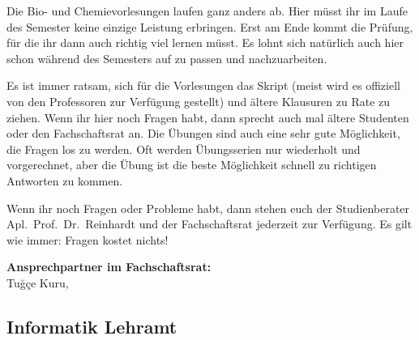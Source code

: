 Die Bio- und Chemievorlesungen laufen ganz anders ab.
Hier müsst ihr im Laufe des Semester keine einzige Leistung erbringen.
Erst am Ende kommt die Prüfung, für die ihr dann auch richtig viel lernen müsst.
Es lohnt sich natürlich auch hier schon während des Semesters auf zu passen und nachzuarbeiten.

Es ist immer ratsam, sich für die Vorlesungen das Skript (meist wird es offiziell von den Professoren zur Verfügung gestellt) und ältere Klausuren zu Rate zu ziehen.
Wenn ihr hier noch Fragen habt, dann sprecht auch mal ältere Studenten oder den Fachschaftsrat an.
Die Übungen sind auch eine sehr gute Möglichkeit, die Fragen los zu werden.
Oft werden Übungsserien nur wiederholt und vorgerechnet, aber die Übung ist die beste Möglichkeit schnell zu richtigen Antworten zu kommen.

Wenn ihr noch Fragen oder Probleme habt, dann stehen euch der Studienberater Apl.\ Prof.\ Dr.\ Reinhardt und der Fachschaftsrat jederzeit zur Verfügung.
Es gilt wie immer: Fragen kostet nichts!

\textbf{Ansprechpartner im Fachschaftsrat:}\\
Tuğçe Kuru, 



\newpage

\subsection{Informatik Lehramt}
\label{studiengang_infolehramt}

